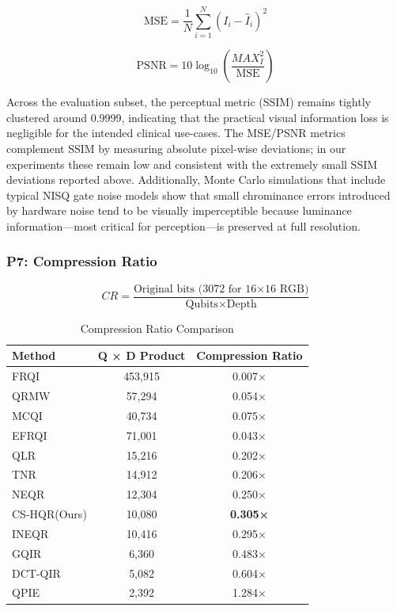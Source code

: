 \documentclass[11pt,a4paper]{article}
\begin{document}
\begin{equation}
\text{MSE} = \frac{1}{N}\sum_{i=1}^{N} (I_i - \hat{I}_i)^2
\end{equation}

\begin{equation}
\text{PSNR} = 10\log_{10}\left(\frac{MAX_I^2}{\text{MSE}}\right)
\end{equation}

Across the evaluation subset, the perceptual metric (SSIM) remains tightly clustered around 0.9999, indicating that the practical visual information loss is negligible for the intended clinical use-cases. The MSE/PSNR metrics complement SSIM by measuring absolute pixel-wise deviations; in our experiments these remain low and consistent with the extremely small SSIM deviations reported above. Additionally, Monte Carlo simulations that include typical NISQ gate noise models show that small chrominance errors introduced by hardware noise tend to be visually imperceptible because luminance information—most critical for perception—is preserved at full resolution.


\subsubsection{P7: Compression Ratio}

\begin{equation}
CR = \frac{\text{Original bits (3072 for 16×16 RGB)}}{\text{Qubits} \times \text{Depth}}
\label{eq:compression_ratio}
\end{equation}

\begin{table}[H]
\centering
\caption{Compression Ratio Comparison}
\label{tab:compression}
\begin{tabular}{@{}lcc@{}}
\toprule
\textbf{Method} & \textbf{Q × D Product} & \textbf{Compression Ratio} \\
\midrule
FRQI & 453,915 & 0.007× \\
QRMW & 57,294 & 0.054× \\
MCQI & 40,734 & 0.075× \\
EFRQI & 71,001 & 0.043× \\
QLR & 15,216 & 0.202× \\
TNR & 14,912 & 0.206× \\
NEQR & 12,304 & 0.250× \\
\rowcolor{green!15}
CS-HQR(Ours) & 10,080 & \textbf{0.305×} \\
INEQR & 10,416 & 0.295× \\
GQIR & 6,360 & 0.483× \\
DCT-QIR & 5,082 & 0.604× \\
QPIE & 2,392 & 1.284× \\
\bottomrule
\end{tabular}
\end{table}
\end{document}
